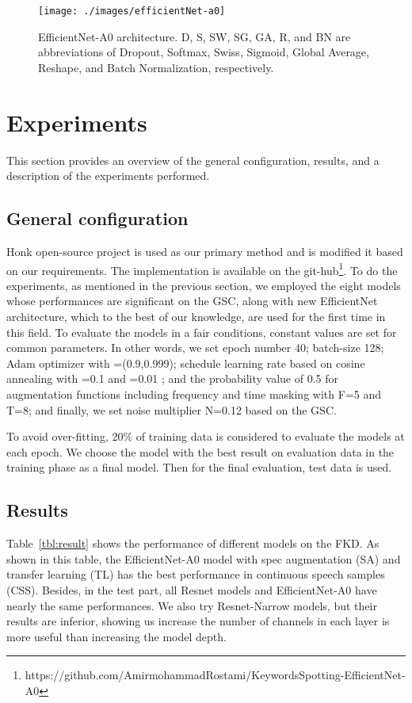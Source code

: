 \documentclass{article}
\begin{document}
\begin{figure}[t]
  \centering
  \texttt{[image: ./images/efficientNet-a0]}
  \caption{EfficientNet-A0 architecture. D, S, SW, SG, GA, R, and BN are abbreviations of Dropout, Softmax, Swiss, Sigmoid, Global Average, Reshape, and Batch Normalization, respectively.}
  \label{fig:effa0}
\end{figure}

\section{Experiments}
This section provides an overview of the general configuration, results, and a description of the experiments performed.

\subsection{General configuration}
Honk open-source project is used as our primary method and is modified it based on our requirements. The implementation is available on the git-hub\footnote{https://github.com/AmirmohammadRostami/KeywordsSpotting-EfficientNet-A0}. To do the experiments, as mentioned in the previous section, we employed the eight models whose performances are significant on the GSC, along with new EfficientNet architecture, which to the best of our knowledge, are used for the first time in this field. To evaluate the models in a fair conditions, constant values are set for common parameters. In other words, we set epoch number 40; batch-size 128; Adam optimizer with =(0.9,0.999); schedule learning rate based on cosine annealing with =0.1  and =0.01 ; and the probability value of 0.5 for augmentation functions including frequency and time masking with F=5 and T=8; and finally, we set noise multiplier N=0.12 based on the GSC.

To avoid over-fitting, 20\% of training data is considered to evaluate the models at each epoch. We choose the model with the best result on evaluation data in the training phase as a final model. Then for the final evaluation, test data is used.

\subsection{Results}

Table~\ref{tbl:result} shows the performance of different models on the FKD. As shown in this table, the EfficientNet-A0 model with spec augmentation (SA) and transfer learning (TL) has the best performance in continuous speech samples (CSS). Besides, in the test part, all Resnet models and EfficientNet-A0 have nearly the same performances. We also try Resnet-Narrow models, but their results are inferior, showing us increase the number of channels in each layer is more useful than increasing the model depth.
\end{document}

